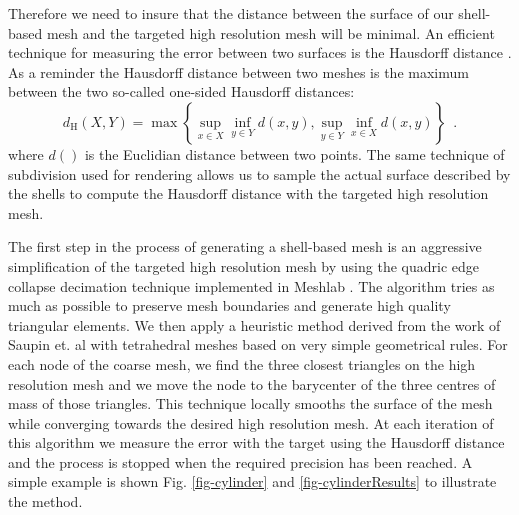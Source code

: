 \documentclass{llncs}
\begin{document}
Therefore we need to insure that the distance between the surface of our shell-based mesh and the targeted high resolution mesh will be minimal. An efficient technique for measuring the error between two surfaces is the Hausdorff distance \cite{Klein96,Cignoni98}. As a reminder the Hausdorff distance between two meshes is the maximum between the two so-called one-sided Hausdorff distances:
\begin{equation}
d_{\mathrm{H}}(X,Y) = \max \left\{ \sup_{x \in X} \inf_{y \in Y} d(x,y), \sup_{y \in Y} \inf_{x \in X} d(x,y) \right\} \enspace .
\end{equation}
where $d()$ is the Euclidian distance between two points. The same technique of subdivision used for rendering allows us to sample the actual surface described by the shells to compute the Hausdorff distance with the targeted high resolution mesh. 

The first step in the process of generating a shell-based mesh is an aggressive simplification of the targeted high resolution mesh by using the quadric edge collapse decimation technique implemented in Meshlab \cite{Meshlab}. The algorithm tries as much as possible to preserve mesh boundaries and generate high quality triangular elements. We then apply a heuristic method derived from the work of Saupin et. al \cite{Saupin07} with tetrahedral meshes based on very simple geometrical rules. For each node of the coarse mesh, we find the three closest triangles on the high resolution mesh and we move the node to the barycenter of the three centres of mass of those triangles. This technique locally smooths the surface of the mesh while converging towards the desired high resolution mesh. At each iteration of this algorithm we measure the error with the target using the Hausdorff distance and the process is stopped when the required precision has been reached. A simple example is shown Fig. \ref{fig-cylinder} and \ref{fig-cylinderResults} to illustrate the method. 
\end{document}
